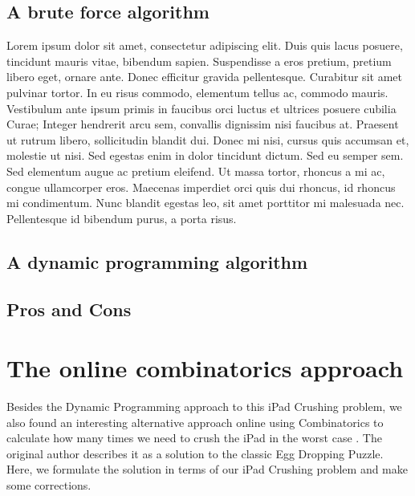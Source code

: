 \documentclass[12pt,a4paper,oneside]{report}
\begin{document}
\section{A brute force algorithm}
Lorem ipsum dolor sit amet, consectetur adipiscing elit. Duis quis lacus posuere, tincidunt mauris vitae, bibendum sapien. Suspendisse a eros pretium, pretium libero eget, ornare ante. Donec efficitur gravida pellentesque. Curabitur sit amet pulvinar tortor. In eu risus commodo, elementum tellus ac, commodo mauris. Vestibulum ante ipsum primis in faucibus orci luctus et ultrices posuere cubilia Curae; Integer hendrerit arcu sem, convallis dignissim nisi faucibus at. Praesent ut rutrum libero, sollicitudin blandit dui. Donec mi nisi, cursus quis accumsan et, molestie ut nisi. Sed egestas enim in dolor tincidunt dictum. Sed eu semper sem. Sed elementum augue ac pretium eleifend. Ut massa tortor, rhoncus a mi ac, congue ullamcorper eros. Maecenas imperdiet orci quis dui rhoncus, id rhoncus mi condimentum. Nunc blandit egestas leo, sit amet porttitor mi malesuada nec. Pellentesque id bibendum purus, a porta risus.

\section{A dynamic programming algorithm}

\section{Pros and Cons}


\chapter{The online combinatorics approach}
Besides the Dynamic Programming approach to this iPad Crushing problem, we also found an interesting alternative approach online using Combinatorics to calculate how many times we need to crush the iPad in the worst case \cite{randomblogpost}. The original author describes it as a solution to the classic Egg Dropping Puzzle. Here, we formulate the solution in terms of our iPad Crushing problem and make some corrections.
\end{document}
